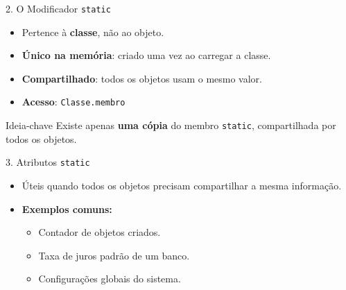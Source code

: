 \documentclass[9pt]{beamer}
\begin{document}
\begin{frame}{2. O Modificador \texttt{static}}

\begin{itemize}
    \item Pertence à \textbf{classe}, não ao objeto.
    \item \textbf{Único na memória}: criado uma vez ao carregar a classe.
    \item \textbf{Compartilhado}: todos os objetos usam o mesmo valor.
    \item \textbf{Acesso}: \texttt{Classe.membro}
\end{itemize}

\vspace{0.3cm}

\begin{center}
\end{center}

\vspace{0.2cm}

\begin{block}{Ideia-chave}
Existe apenas \textbf{uma cópia} do membro \texttt{static}, compartilhada por todos os objetos.
\end{block}

\end{frame}

\begin{frame}{3. Atributos \texttt{static}}
    \begin{itemize}
        \item Úteis quando todos os objetos precisam compartilhar a mesma informação.
        \item \textbf{Exemplos comuns:}
        \begin{itemize}
            \item Contador de objetos criados.
            \item Taxa de juros padrão de um banco.
            \item Configurações globais do sistema.
        \end{itemize}
    \end{itemize}
\end{frame}
\end{document}
